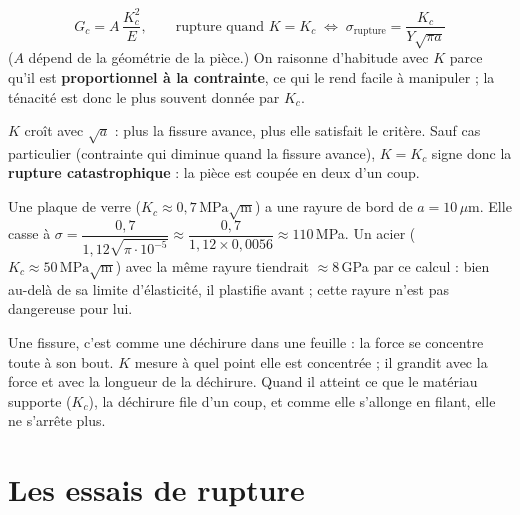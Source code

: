 \begin{thmbox}[title={Les deux critères se rejoignent (à connaître par c\oe ur)}]
\[ G_c = A\,\frac{K_c^2}{E}, \qquad\text{rupture quand } K = K_c
   \;\Longleftrightarrow\; \sigma_{\text{rupture}} = \frac{K_c}{Y\sqrt{\pi a}} \]
($A$ dépend de la géométrie de la pièce.) On raisonne d'habitude avec $K$ parce qu'il est
\textbf{proportionnel à la contrainte}, ce qui le rend facile à manipuler ; la ténacité est donc
le plus souvent donnée par $K_c$.
\end{thmbox}

\begin{propbox}[title={Une fois partie, la fissure ne s'arrête pas}]
$K$ croît avec $\sqrt a$ : plus la fissure avance, plus elle satisfait le critère. Sauf cas
particulier (contrainte qui diminue quand la fissure avance), $K = K_c$ signe donc la
\textbf{rupture catastrophique} : la pièce est coupée en deux d'un coup.
\end{propbox}

\begin{exbox}[title={Exemple chiffré (pas dans les diapositives)}]
Une plaque de verre ($K_c \approx 0{,}7\,\text{MPa}\sqrt{\text{m}}$) a une rayure de bord de
$a = 10\,\mu$m. Elle casse à
$\sigma = \dfrac{0{,}7}{1{,}12\sqrt{\pi\cdot10^{-5}}} \approx \dfrac{0{,}7}{1{,}12 \times 0{,}0056}
\approx 110$\,MPa.
Un acier ($K_c \approx 50\,\text{MPa}\sqrt{\text{m}}$) avec la même rayure tiendrait
$\approx 8$\,GPa par ce calcul : bien au-delà de sa limite d'élasticité, il plastifie avant ;
cette rayure n'est pas dangereuse pour lui.
\end{exbox}

\begin{goatbox}
Une fissure, c'est comme une déchirure dans une feuille : la force se concentre toute à son
bout. $K$ mesure à quel point elle est concentrée ; il grandit avec la force et avec la longueur
de la déchirure. Quand il atteint ce que le matériau supporte ($K_c$), la déchirure file d'un
coup, et comme elle s'allonge en filant, elle ne s'arrête plus.
\end{goatbox}

\section{Les essais de rupture}

